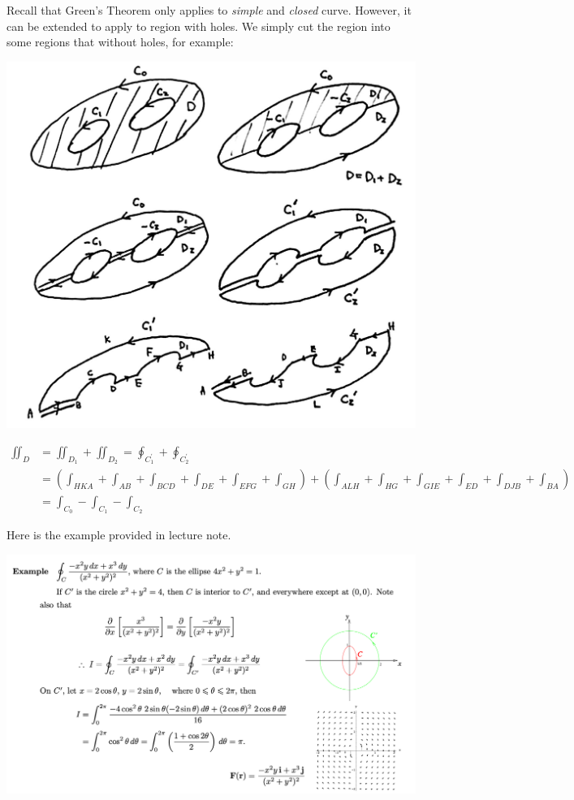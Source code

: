 \documentclass[11pt, a4paper]{MATH2023}
\begin{document}
\begin{spacing}{1.3}
    {}

    Recall that Green's Theorem only applies to {\it simple} and {\it closed} curve. 
    However, it can be extended to apply to region with holes. We simply cut the region 
    into some regions that without holes, for example:
    \begin{center}
        \includegraphics[scale=0.23]{images/Ch16-general-green.JPG}
    \end{center}
    \begin{align*}
        \iint_D &= \iint_{D_1}+\iint_{D_2} = \oint_{C_1^\prime}+\oint_{C_2^\prime}\\
        &= \left( \int_{HKA}+\int_{AB}+\int_{BCD}+\int_{DE}+\int_{EFG}+\int_{GH} \right)
        + \left( \int_{ALH}+\int_{HG}+\int_{GIE}+\int_{ED}+\int_{DJB}+\int_{BA} \right)\\
        &= \int_{C_0}-\int_{C_1}-\int_{C_2}
    \end{align*}



    \newpage
    {\blue Here is the example provided in lecture note.}
    
    \includegraphics[scale=0.44]{images/Ch16-general-green-eg.png}




\end{spacing}
\end{document}
